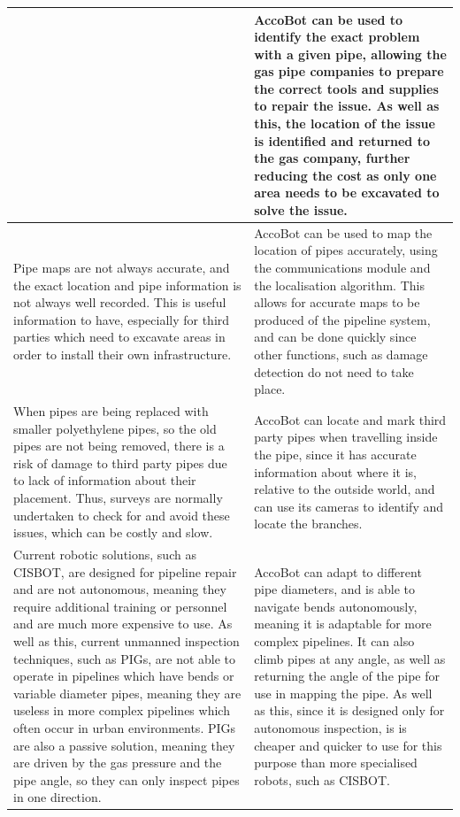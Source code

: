 \documentclass[11pt]{article}		%
\begin{document}
\begin{longtable}[c]{| m{} | m{} |}
			& 
			AccoBot can be used to identify the exact problem with a given pipe, allowing the gas pipe companies to prepare the correct tools and supplies to repair the issue.
			As well as this, the location of the issue is identified and returned to the gas company, further reducing the cost as only one area needs to be excavated to solve the issue.
			\\
			\hline
			\rowcolor{rowGrey}
			Pipe maps are not always accurate, and the exact location and pipe information is not always well recorded.
			This is useful information to have, especially for third parties which need to excavate areas in order to install their own infrastructure.
			& 
			AccoBot can be used to map the location of pipes accurately, using the communications module and the localisation algorithm.
			This allows for accurate maps to be produced of the pipeline system, and can be done quickly since other functions, such as damage detection do not need to take place.
			\\
			\hline
			\rowcolor{rowGrey}
			When pipes are being replaced with smaller polyethylene pipes, so the old pipes are not being removed, there is a risk of damage to third party pipes due to lack of information about their placement. %
			Thus, surveys are normally undertaken to check for and avoid these issues, which can be costly and slow.
			& 
			AccoBot can locate and mark third party pipes when travelling inside the pipe, since it has accurate information about where it is, relative to the outside world, and can use its cameras to identify and locate the branches.
			\\
			\hline
			\rowcolor{rowGrey} Current robotic solutions, such as CISBOT, are designed for pipeline repair and are not autonomous, meaning they require additional training or personnel and are much more expensive to use.
			As well as this, current unmanned inspection techniques, such as PIGs, are not able to operate in pipelines which have bends or variable diameter pipes, meaning they are useless in more complex pipelines which often occur in urban environments.
			PIGs are also a passive solution, meaning they are driven by the gas pressure and the pipe angle, so they can only inspect pipes in one direction.
			& 
			AccoBot can adapt to different pipe diameters, and is able to navigate bends autonomously, meaning it is adaptable for more complex pipelines.
			It can also climb pipes at any angle, as well as returning the angle of the pipe for use in mapping the pipe.
			As well as this, since it is designed only for autonomous inspection, is is cheaper and quicker to use for this purpose than more specialised robots, such as CISBOT.
			\label{solutionTable}
		\end{longtable}
		
\end{document}
